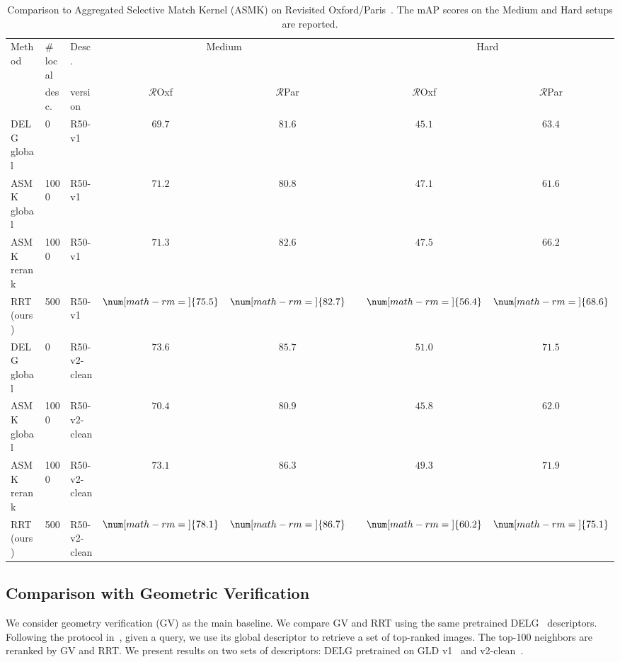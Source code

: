 \begin{table}[t]
\scalebox{0.88} {
\setlength{\tabcolsep}{2pt}
\centering
{
\begin{tabular}{l l l c c c c c}
\toprule
\multirow{2}{*}{Method} & \# local & Desc. & \multicolumn{2}{c}{ Medium} && \multicolumn{2}{c}{ Hard} \\
& desc. &version & \multicolumn{1}{c}{\normalsize \vphantom{M} \normalsize $\mathcal{R}$Oxf } & \multicolumn{1}{c}{\normalsize $\mathcal{R}$Par} && \multicolumn{1}{c}{\normalsize $\mathcal{R}$Oxf} &  \multicolumn{1}{c}{\normalsize $\mathcal{R}$Par}\\
\midrule
DELG global & 0 & R50-v1 & $69.7$ & $81.6$ & & $45.1$ & $63.4$\\
ASMK global & 1000 & R50-v1 & $71.2$ & $80.8$ && $47.1$ & $61.6$\\
ASMK rerank & 1000 & R50-v1 & $71.3$ & $82.6$ && $47.5$ & $66.2$\\
RRT (ours) & 500 & R50-v1 & $\num[math-rm=\mathbf]{75.5}$ & $\num[math-rm=\mathbf]{82.7}$ && $\num[math-rm=\mathbf]{56.4}$ & $\num[math-rm=\mathbf]{68.6}$\\
\midrule
DELG global & 0 & R50-v2-clean & $73.6$ & $85.7$ && $51.0$ & $71.5$\\
ASMK global & 1000 & R50-v2-clean & $70.4$ & $80.9$ && $45.8$ & $62.0$\\
ASMK rerank & 1000 & R50-v2-clean & $73.1$ & $86.3$ && $49.3$ & $71.9$\\
RRT (ours) & 500 & R50-v2-clean & $\num[math-rm=\mathbf]{78.1}$ & $\num[math-rm=\mathbf]{86.7}$ && $\num[math-rm=\mathbf]{60.2}$ & $\num[math-rm=\mathbf]{75.1}$\\
\bottomrule
\end{tabular}
}
}
\vspace{-0.5em}
\caption{Comparison to Aggregated Selective Match Kernel (ASMK) on Revisited Oxford/Paris~\cite{revisited}. 
The mAP scores on the Medium and Hard setups are reported.
\vspace{-1.5em}
}
\label{tab:rt_vs_asmk}
\end{table}

\subsection{Comparison with Geometric Verification}
We consider geometry verification (GV) as the main baseline.
We compare GV and RRT using the same pretrained DELG~\cite{delg2020} descriptors.
Following the protocol in~\cite{delg2020}, given a query, we use its global descriptor to retrieve a set of top-ranked images. 
The top-100 neighbors are reranked by GV and RRT.
We present results on two sets of descriptors: DELG pretrained on GLD v1~\cite{delf2017} and v2-clean~\cite{gldv2}.

